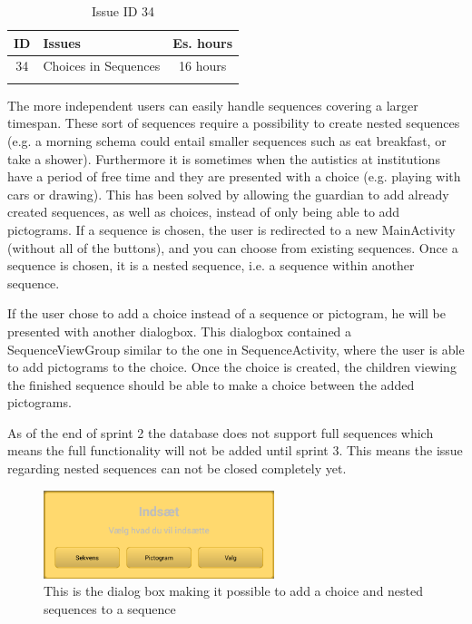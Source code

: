 \begin{longtable} { | c | p{12cm} | c | } 
\hline
	ID 	&	Issues	&		 Es. hours \\\hline
	34 	&	Choices in Sequences		&	16 hours \\\hline
\caption{Issue ID 34}
\label{tab:spr2_nested}
\end{longtable}

The more independent users can easily handle sequences covering a larger timespan. These sort of sequences require a possibility to create nested sequences (e.g. a morning schema could entail smaller sequences such as eat breakfast, or take a shower). Furthermore it is sometimes when the autistics at institutions have a period of free time and they are presented with a choice (e.g. playing with cars or drawing).
This has been solved by allowing the guardian to add already created sequences, as well as choices, instead of only being able to add pictograms. If a sequence is chosen, the user is redirected to a new MainActivity (without all of the buttons), and you can choose from existing sequences. Once a sequence is chosen, it is a nested sequence, i.e. a sequence within another sequence. 

If the user chose to add a choice instead of a sequence or pictogram, he will be presented with another dialogbox. This dialogbox contained a SequenceViewGroup similar to the one in SequenceActivity, where the user is able to add pictograms to the choice. Once the choice is created, the children viewing the finished sequence should be able to make a choice between the added pictograms.

As of the end of sprint 2 the database does not support full sequences which means the full functionality will not be added until sprint 3. This means the issue regarding nested sequences can not be closed completely yet.

\begin{figure} [h!]
\centering
\includegraphics[width=0.6\textwidth]{Pics/Sprint2/dialogs/magicAdd.png}
\caption{This is the dialog box making it possible to add a choice and nested sequences to a sequence}
\label{fig:addDialog}
\end{figure}




